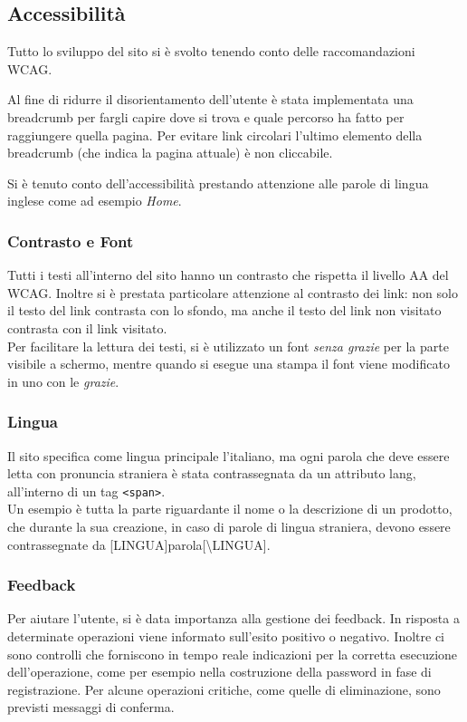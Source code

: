 \documentclass[a4paper, 11pt]{article}
\begin{document}
\pagebreak

\subsection{Accessibilità}

Tutto lo sviluppo del sito si è svolto tenendo conto delle raccomandazioni WCAG. 

Al fine di ridurre il disorientamento dell’utente è stata implementata una breadcrumb per fargli capire dove si trova e quale percorso ha fatto per raggiungere quella pagina. 
Per evitare link circolari l’ultimo elemento della breadcrumb (che indica la pagina attuale) è non cliccabile.

Si è tenuto conto dell'accessibilità prestando attenzione alle parole di lingua inglese come ad esempio \textit{Home}.

\subsubsection{Contrasto e Font}

Tutti i testi all'interno del sito hanno un contrasto che rispetta il livello AA del WCAG. Inoltre si è prestata particolare attenzione al contrasto dei link: non solo il testo del link contrasta con lo sfondo, ma anche il testo del link non visitato contrasta con il link visitato. \\
Per facilitare la lettura dei testi, si è utilizzato un font \textit{senza grazie} per la parte visibile a schermo, mentre quando si esegue una stampa il font viene modificato in uno con le \textit{grazie}. 

\subsubsection{Lingua}
Il sito specifica come lingua principale l’italiano, ma ogni parola che deve essere letta con pronuncia straniera è stata contrassegnata da un attributo lang, all’interno di un tag \texttt{<span>}. \\
Un esempio è tutta la parte riguardante il nome o la descrizione di un prodotto, che durante la sua creazione, in caso di parole di lingua straniera,  devono essere contrassegnate da [LINGUA]parola[\textbackslash LINGUA].

\subsubsection{Feedback}
Per aiutare l’utente, si è data importanza alla gestione dei feedback. 
In risposta a determinate operazioni viene informato sull’esito positivo o negativo. Inoltre ci sono controlli che forniscono in tempo reale indicazioni per la corretta esecuzione dell’operazione, come per esempio nella costruzione della password in fase di registrazione. 
Per alcune operazioni critiche, come quelle di eliminazione, sono previsti messaggi di conferma. 
\end{document}
